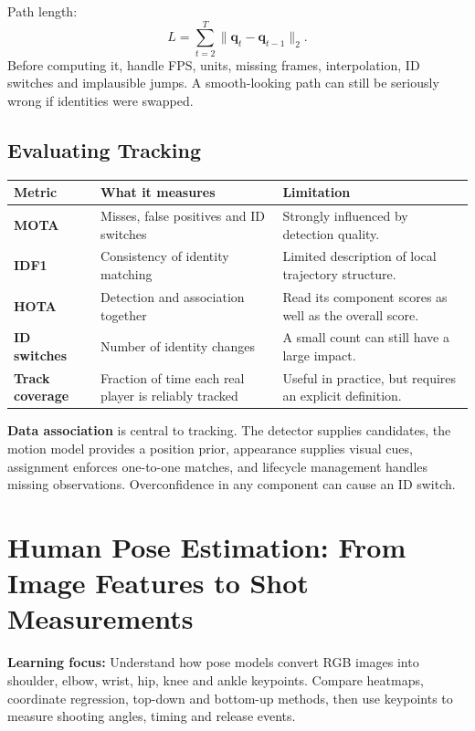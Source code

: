 \documentclass[11pt,a4paper,oneside]{report}
\begin{document}
Path length:
\[
L=\sum_{t=2}^{T}\|\mathbf q_t-\mathbf q_{t-1}\|_2.
\]
Before computing it, handle FPS, units, missing frames, interpolation, ID switches and implausible jumps. A smooth-looking path can still be seriously wrong if identities were swapped.

\section{Evaluating Tracking}
\begingroup\small

\begin{tabularx}{\textwidth}{>{\bfseries\RaggedRight}p{2.7cm} Y Y}
\toprule
Metric & What it measures & Limitation \\
\midrule
MOTA & Misses, false positives and ID switches & Strongly influenced by detection quality.\\
IDF1 & Consistency of identity matching & Limited description of local trajectory structure.\\
HOTA & Detection and association together & Read its component scores as well as the overall score.\\
ID switches & Number of identity changes & A small count can still have a large impact.\\
Track coverage & Fraction of time each real player is reliably tracked & Useful in practice, but requires an explicit definition.\\
\bottomrule
\end{tabularx}

\begin{takeawayBox}
\textbf{Data association} is central to tracking. The detector supplies candidates, the motion model provides a position prior, appearance supplies visual cues, assignment enforces one-to-one matches, and lifecycle management handles missing observations. Overconfidence in any component can cause an ID switch.
\end{takeawayBox}

\endgroup

\chapter{Human Pose Estimation: From Image Features to Shot Measurements}

\begin{heroBox}
\textbf{Learning focus:}\quad
Understand how pose models convert RGB images into shoulder, elbow, wrist, hip, knee and ankle keypoints. Compare heatmaps, coordinate regression, top-down and bottom-up methods, then use keypoints to measure shooting angles, timing and release events.
\end{heroBox}
\end{document}

